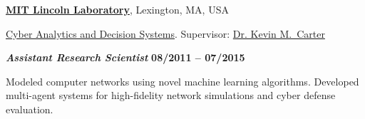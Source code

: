 \href{http://www.ll.mit.edu/}{\textbf{MIT Lincoln Laboratory}},
Lexington, MA, USA

\href{https://www.ll.mit.edu/mission/cybersec/CADS/CADS.html}
{Cyber Analytics and Decision Systems}.
Supervisor:
\href{https://www.ll.mit.edu/mission/cybersec/cybersec-bios/carter-bio.html}
{Dr. Kevin M.~Carter}

\vspace{-0.5em}

\begin{outerlist}

\vspace{-0.5em}

\item[] {\normalsize \textbf{\textit{Assistant Research Scientist}}}%
\hfill \textbf{08/2011 -- 07/2015}

\vspace{-0.5em}

Modeled computer networks using novel machine learning algorithms.
Developed multi-agent systems for high-fidelity network simulations and cyber defense evaluation.

\end{outerlist}
